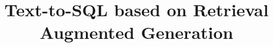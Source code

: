 \documentclass[xcolor=dvipsnames,compress,t,pdf,9pt]{beamer}
\title[\insertframenumber /\inserttotalframenumber]{Text-to-SQL based on Retrieval Augmented Generation}
\begin{document}
	\begin{frame}
	\titlepage
	\end{frame}
	

	
	
	
\end{document}

